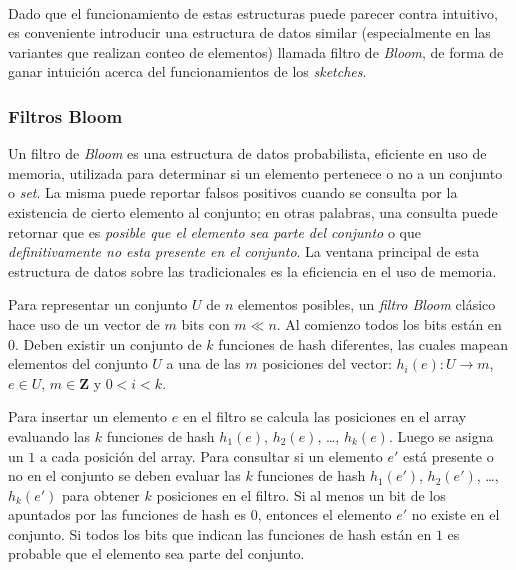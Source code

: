 \documentclass[a4paper,10pt, oneside]{article}
\begin{document}
\

Dado que el funcionamiento de estas estructuras puede parecer contra intuitivo, es conveniente introducir una estructura de datos similar (especialmente en las variantes que realizan conteo de elementos) llamada filtro de \textit{Bloom}, de forma de ganar intuición acerca del funcionamientos de los \textit{sketches}.

\subsubsection{Filtros Bloom}

Un filtro de \textit{Bloom} es una estructura de datos probabilista, eficiente en uso de memoria, utilizada para determinar si un elemento pertenece o no a un conjunto o \textit{set}. La misma puede reportar falsos positivos cuando se consulta por la existencia de cierto elemento al conjunto\cite{Putze:2010:CHS:1498698.1594230}; en otras palabras, una consulta puede retornar que es \textit{posible que el elemento sea parte del conjunto} o que \textit{definitivamente no esta presente en el conjunto}. La ventana principal de esta estructura de datos sobre las tradicionales es la eficiencia en el uso de memoria.


Para representar un conjunto $U$ de $n$ elementos posibles, un \textit{filtro Bloom} clásico hace uso de un vector de $m$ bits con $m \ll n$. Al comienzo todos los bits están en $0$. Deben existir un conjunto de $k$ funciones de hash diferentes, las cuales mapean elementos del conjunto $U$ a una de las $m$ posiciones del vector: $h_i(e): U \rightarrow m$, $e \in U$, $m \in \mathbf{Z}$ y $0 < i < k$.


Para insertar un elemento $e$ en el filtro se calcula las posiciones en el array evaluando las $k$ funciones de hash $h_1(e)$, $h_2(e)$, \dots, $h_k(e)$. Luego se asigna un $1$ a cada posición del array. Para consultar si un elemento $e'$ está presente o no en el conjunto se deben evaluar las $k$ funciones de hash $h_1(e')$, $h_2(e')$, \dots, $h_k(e')$ para obtener $k$ posiciones en el filtro. Si al menos un bit de los apuntados por las funciones de hash es $0$, entonces el elemento $e'$ no existe en el conjunto. Si todos los bits que indican las funciones de hash están en $1$ es probable que el elemento sea parte del conjunto.
\end{document}
